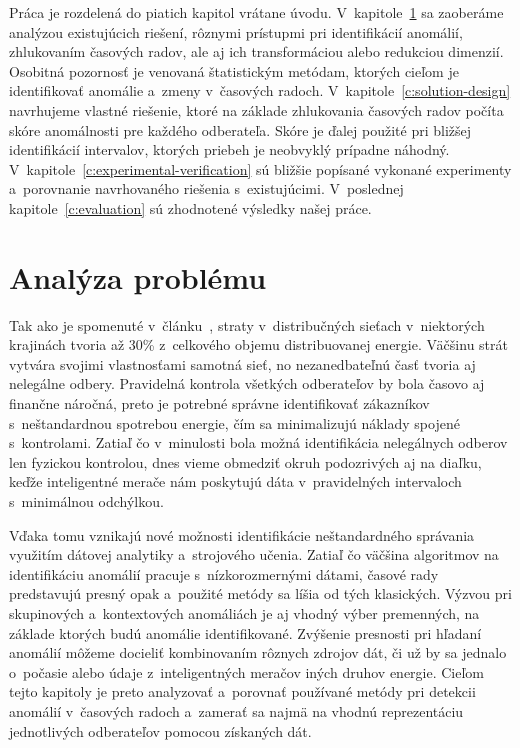 \documentclass[a4paper,twoside,slovak,12pt,appendix]{article}
\begin{document}
Práca je rozdelená do piatich kapitol vrátane úvodu.
V~kapitole~\ref{c:problem-analysis} sa zaoberáme analýzou existujúcich riešení,
rôznymi prístupmi pri identifikácií anomálií, zhlukovaním časových radov, ale aj
ich transformáciou alebo redukciou dimenzií. Osobitná pozornosť je venovaná
štatistickým metódam, ktorých cieľom je identifikovať anomálie a~zmeny
v~časových radoch. V~kapitole~\ref{c:solution-design} navrhujeme vlastné
riešenie, ktoré na základe zhlukovania časových radov počíta skóre anomálnosti
pre každého odberateľa. Skóre je ďalej použité pri bližšej identifikácií
intervalov, ktorých priebeh je neobvyklý prípadne náhodný.
V~kapitole~\ref{c:experimental-verification} sú bližšie popísané vykonané
experimenty a~porovnanie navrhovaného riešenia s~existujúcimi. V~poslednej
kapitole~\ref{c:evaluation} sú zhodnotené výsledky našej práce.

\newpage\null\thispagestyle{empty}\newpage


\newpage
\section{Analýza problému}
\label{c:problem-analysis}
Tak ako je spomenuté v~článku~\cite{Meffe2009}, straty v~distribučných sieťach
v~niektorých krajinách tvoria až 30\% z~celkového objemu distribuovanej energie.
Väčšinu strát vytvára svojimi vlastnosťami samotná sieť, no nezanedbateľnú časť
tvoria aj nelegálne odbery. Pravidelná kontrola všetkých odberateľov by bola
časovo aj finančne náročná, preto je potrebné správne identifikovať zákazníkov
s~neštandardnou spotrebou energie, čím sa minimalizujú náklady spojené
s~kontrolami. Zatiaľ čo v~minulosti bola možná identifikácia nelegálnych odberov
len fyzickou kontrolou, dnes vieme obmedziť okruh podozrivých aj na diaľku,
keďže inteligentné merače nám poskytujú dáta v~pravidelných intervaloch
s~minimálnou odchýlkou.

Vďaka tomu vznikajú nové možnosti identifikácie neštandardného správania
využitím dátovej analytiky a~strojového učenia. Zatiaľ čo väčšina algoritmov na
identifikáciu anomálií pracuje s~nízkorozmernými dátami, časové rady predstavujú
presný opak a~použité metódy sa líšia od tých klasických. Výzvou pri skupinových
a~kontextových anomáliách je aj vhodný výber premenných, na základe ktorých budú
anomálie identifikované. Zvýšenie presnosti pri hľadaní anomálií môžeme docieliť
kombinovaním rôznych zdrojov dát, či už by sa jednalo o~počasie alebo údaje
z~inteligentných meračov iných druhov energie. Cieľom tejto kapitoly je preto
analyzovať a~porovnať používané metódy pri detekcii anomálií v~časových radoch
a~zamerať sa najmä na vhodnú reprezentáciu jednotlivých odberateľov pomocou
získaných dát.
\end{document}
